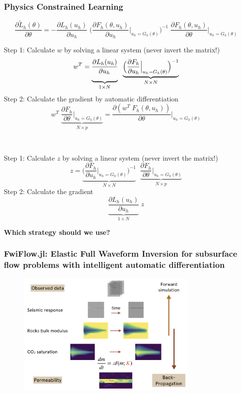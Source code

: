 \documentclass{beamer}
\begin{document}
\begin{frame}
	\frametitle{Physics Constrained Learning}	
	{\scriptsize$$\boxed{\frac{{\partial {{\tilde L}_h}(\theta )}}{{\partial \theta }} 
    = - \frac{{\partial {L_h}({u_h})}}{{\partial {u_h}}} \;
    \Big( {\frac{{\partial {F_h(\theta, u_h)}}}{{\partial {u_h}}}\Big|_{u_h = {G_h}(\theta )}} \Big)^{ - 1} \;
    \frac{{\partial {F_h(\theta, u_h)}}}{{\partial \theta }}\Big|_{u_h = {G_h}(\theta )}}$$}
	\begin{minipage}[t]{0.48\textwidth}
		Step 1: Calculate $w$ by solving a linear system (never invert the matrix!)
{\scriptsize$$w^T = \underbrace{\frac{{\partial {L_h}({u_h})}}{{\partial {u_h}}\rule[-9pt]{1pt}{0pt}}}_{1\times N} 
        \;\;
        \underbrace{\Big( {\frac{{\partial {F_h}}}{{\partial {u_h}}}\Big|_{u_h = {G_h}(\theta )}} \Big)^{ - 1}}_{N\times N}$$}
Step 2: Calculate the gradient by automatic differentiation 
{\scriptsize$$w^T\;\underbrace{\frac{{\partial {F_h}}}{{\partial \theta }}\Big|_{u_h = {G_h}(\theta )}}_{N\times p} = \frac{\partial (w^T\;  {F_h}(\theta, u_h))}{\partial \theta }\Bigg|_{u_h = {G_h}(\theta )}$$}
	\end{minipage}\hfill\vline\hfill~
	\begin{minipage}[t]{0.48\textwidth}
		Step 1: Calculate $z$ by solving a linear system (never invert the matrix!)
		{\scriptsize$$z = \underbrace{
            \Big( {\frac{{\partial {F_h}}}{{\partial {u_h}}}\Big|_{u_h = {G_h}(\theta )}} \Big)^{ - 1}}_{N\times N}
            \;\; \underbrace{\frac{{\partial {F_h}}}{{\partial \theta }}\Big|_{u_h = {G_h}(\theta )}}_{N\times p}$$}
           Step 2: Calculate the gradient
           {\scriptsize$$\underbrace{\frac{{\partial {L_h}({u_h})}}{{\partial {u_h}}}}_{1\times N}\; z$$}
	\end{minipage}
	\begin{center}
		\textbf{Which strategy should we use?}
	\end{center}
\end{frame}

\begin{frame}
	\frametitle{FwiFlow.jl: Elastic Full Waveform Inversion for subsurface flow problems with intelligent automatic differentiation}
	\begin{figure}[hbt]
  \includegraphics[width=0.8\textwidth]{../geo.png}
\end{figure}
\end{frame}
\end{document}
